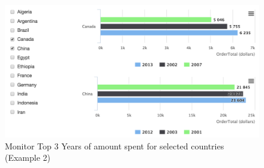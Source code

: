 \begin{figure}[!ht]
\centering
\includegraphics[width=14cm]{images/complex-example}
\caption{Monitor Top 3 Years of amount spent for selected countries (Example 2)}
\label{fig:complex-example}
\end{figure}

